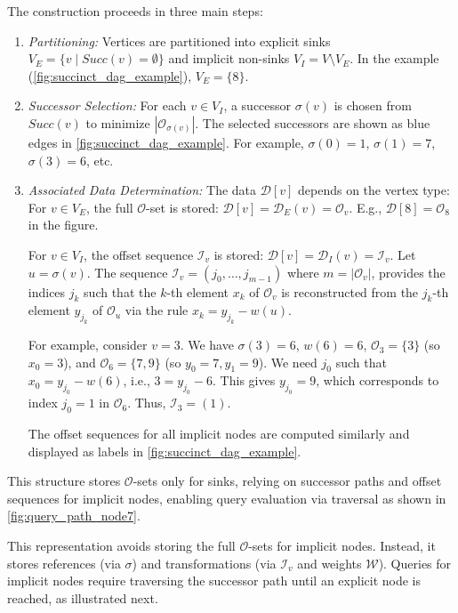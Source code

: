 The construction proceeds in three main steps:

\begin{enumerate}
    \item \emph{Partitioning:} Vertices are partitioned into explicit sinks $V_E = \{ v \mid Succ(v) = \emptyset \}$ and implicit non-sinks $V_I = V \setminus V_E$. In the example (\autoref{fig:succinct_dag_example}), $V_E=\{8\}$.

    \item \emph{Successor Selection:} For each $v \in V_I$, a successor $\sigma(v)$ is chosen from $Succ(v)$ to minimize $|\mathcal{O}_{\sigma(v)}|$. The selected successors are shown as blue edges in \autoref{fig:succinct_dag_example}. For example, $\sigma(0)=1$, $\sigma(1)=7$, $\sigma(3)=6$, etc.
    \item \emph{Associated Data Determination:} The data $\mathcal{D}[v]$ depends on the vertex type:
          For $v \in V_E$, the full $\mathcal{O}$-set is stored: $\mathcal{D}[v] = \mathcal{D}_E(v) = \mathcal{O}_v$. E.g., $\mathcal{D}[8] = \mathcal{O}_8$ in the figure.

          For $v \in V_I$, the offset sequence $\mathcal{I}_v$ is stored: $\mathcal{D}[v] = \mathcal{D}_I(v) = \mathcal{I}_v$. Let $u = \sigma(v)$. The sequence $\mathcal{I}_v = (j_0, \dots, j_{m-1})$ where $m=|\mathcal{O}_v|$, provides the indices $j_k$ such that the $k$-th element $x_k$ of $\mathcal{O}_v$ is reconstructed from the $j_k$-th element $y_{j_k}$ of $\mathcal{O}_u$ via the rule $x_k = y_{j_k} - w(u)$.

          For example, consider $v=3$. We have $\sigma(3)=6$, $w(6)=6$, $\mathcal{O}_3=\{3\}$ (so $x_0=3$), and $\mathcal{O}_6=\{7, 9\}$ (so $y_0=7, y_1=9$). We need $j_0$ such that $x_0 = y_{j_0} - w(6)$, i.e., $3 = y_{j_0} - 6$. This gives $y_{j_0}=9$, which corresponds to index $j_0=1$ in $\mathcal{O}_6$. Thus, $\mathcal{I}_3 = (1)$.

          The offset sequences for all implicit nodes are computed similarly and displayed as labels in \autoref{fig:succinct_dag_example}.
\end{enumerate}

This structure stores $\mathcal{O}$-sets only for sinks, relying on successor paths and offset sequences for implicit nodes, enabling query evaluation via traversal as shown in \autoref{fig:query_path_node7}.

This representation avoids storing the full $\mathcal{O}$-sets for implicit nodes. Instead, it stores references (via $\sigma$) and transformations (via $\mathcal{I}_v$ and weights $\mathcal{W}$). Queries for implicit nodes require traversing the successor path until an explicit node is reached, as illustrated next.

